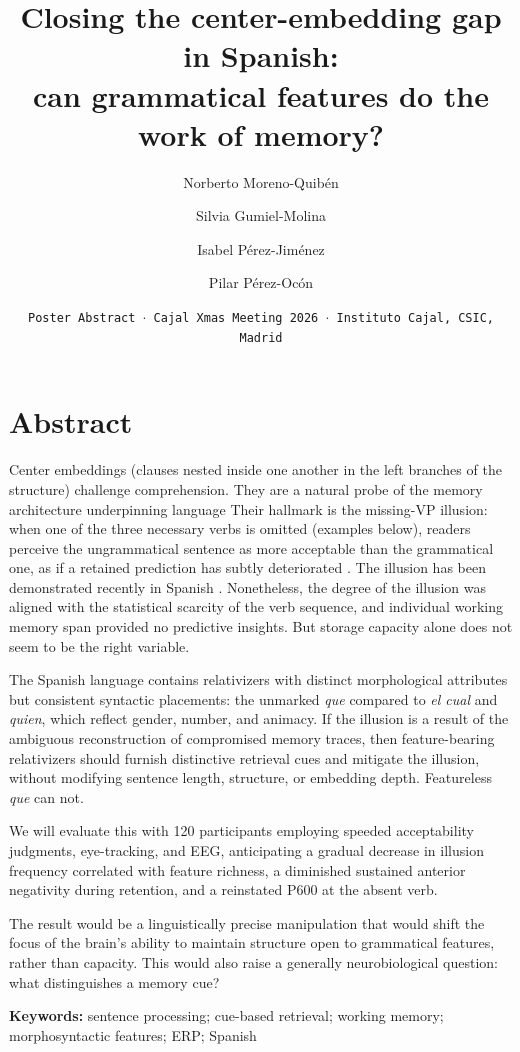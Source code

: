 \documentclass[12pt]{article}
\title{Closing the center-embedding gap in Spanish:\\can grammatical features do the work of memory?}
\author[1]{Norberto Moreno-Quibén}
\author[2]{Silvia Gumiel-Molina}
\author[3]{Isabel Pérez-Jiménez}
\author[4]{Pilar Pérez-Ocón}
\affil[1,2,3,4]{Departamento de Filología, Comunicación y Documentación, Universidad de Alcalá (UAH)}
\date{{\small {\tt Poster Abstract $\cdot$ Cajal Xmas Meeting 2026 $\cdot$ Instituto Cajal, CSIC, Madrid}}}
\newcommand{\es}[1]{\foreignlanguage{spanish}{\textit{#1}}}
\begin{document}
\maketitle

\section*{Abstract}

Center embeddings (clauses nested inside one another in the left branches of the structure) challenge comprehension. They are a natural probe of the memory architecture underpinning language \parencite{Karlsson2007} Their hallmark is the missing-VP illusion: when one of the three necessary verbs is omitted (examples below), readers perceive the ungrammatical sentence as more acceptable than the grammatical one, as if a retained prediction has subtly deteriorated \parencite{Lewis2005,Hahn2022}. The illusion has been demonstrated recently in Spanish \cite{Paneda2024}. Nonetheless, the degree of the illusion was aligned with the statistical scarcity of the verb sequence, and individual working memory span provided no predictive insights. But storage capacity alone does not seem to be the right variable.

The Spanish language contains relativizers with distinct morphological attributes but consistent syntactic placements: the unmarked \es{que} compared to \es{el cual} and \es{quien}, which reflect gender, number, and animacy. If the illusion is a result of the ambiguous reconstruction of compromised memory traces, then feature-bearing relativizers should furnish distinctive retrieval cues and mitigate the illusion, without modifying sentence length, structure, or embedding depth. Featureless \es{que} can not.

We will evaluate this with 120 participants employing speeded acceptability judgments, eye-tracking, and EEG, anticipating a gradual decrease in illusion frequency correlated with feature richness, a diminished sustained anterior negativity during retention, and a reinstated P600 at the absent verb.

The result would be a linguistically precise manipulation that would shift the focus of the brain's ability to maintain structure open to grammatical features, rather than capacity. This would also raise a generally neurobiological question: what distinguishes a memory cue?

\vspace{6pt}

\textbf{Keywords:} sentence processing; cue-based retrieval; working memory; morphosyntactic features; ERP; Spanish
\end{document}
